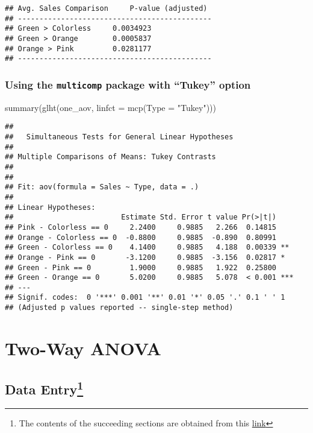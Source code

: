 \documentclass[
]{book}
\newenvironment{Shaded}{\begin{snugshade}}{\end{snugshade}}
\newcommand{\AttributeTok}[1]{\textcolor[rgb]{0.77,0.63,0.00}{#1}}
\newcommand{\FunctionTok}[1]{\textcolor[rgb]{0.00,0.00,0.00}{#1}}
\newcommand{\NormalTok}[1]{#1}
\newcommand{\StringTok}[1]{\textcolor[rgb]{0.31,0.60,0.02}{#1}}
\begin{document}
\begin{verbatim}
## Avg. Sales Comparison     P-value (adjusted)
## ---------------------------------------------
## Green > Colorless     0.0034923
## Green > Orange        0.0005837
## Orange > Pink         0.0281177
## ---------------------------------------------
\end{verbatim}

\hypertarget{using-the-multicomp-package-with-tukey-option}{%
\section{\texorpdfstring{Using the \texttt{multicomp} package with ``Tukey'' option}{Using the multicomp package with ``Tukey'' option}}\label{using-the-multicomp-package-with-tukey-option}}

\begin{Shaded}
\begin{Highlighting}[]
\FunctionTok{summary}\NormalTok{(}\FunctionTok{glht}\NormalTok{(one\_aov, }\AttributeTok{linfct =} \FunctionTok{mcp}\NormalTok{(}\AttributeTok{Type =} \StringTok{"Tukey"}\NormalTok{)))}
\end{Highlighting}
\end{Shaded}

\begin{verbatim}
## 
##   Simultaneous Tests for General Linear Hypotheses
## 
## Multiple Comparisons of Means: Tukey Contrasts
## 
## 
## Fit: aov(formula = Sales ~ Type, data = .)
## 
## Linear Hypotheses:
##                         Estimate Std. Error t value Pr(>|t|)    
## Pink - Colorless == 0     2.2400     0.9885   2.266  0.14815    
## Orange - Colorless == 0  -0.8800     0.9885  -0.890  0.80991    
## Green - Colorless == 0    4.1400     0.9885   4.188  0.00339 ** 
## Orange - Pink == 0       -3.1200     0.9885  -3.156  0.02817 *  
## Green - Pink == 0         1.9000     0.9885   1.922  0.25800    
## Green - Orange == 0       5.0200     0.9885   5.078  < 0.001 ***
## ---
## Signif. codes:  0 '***' 0.001 '**' 0.01 '*' 0.05 '.' 0.1 ' ' 1
## (Adjusted p values reported -- single-step method)
\end{verbatim}

\hypertarget{part-two-way-anova}{%
\part*{Two-Way ANOVA}\label{part-two-way-anova}}

\hypertarget{data-entry-1}{%
\chapter[Data Entry]{\texorpdfstring{Data Entry\footnote{The contents of the succeeding sections are obtained from this \href{http://www.sthda.com/english/wiki/two-way-anova-test-in-r\#compute-two-way-anova-test-in-r-for-unbalanced-designs}{link}}}{Data Entry}}\label{data-entry-1}}
\end{document}
